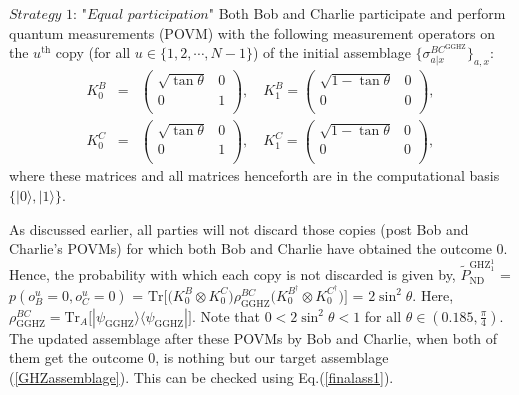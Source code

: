 \documentclass[reprint,superscriptaddress,nofootinbib,amsmath,amssymb,aps,pra,longbibliography]{revtex4-1}
\begin{document}
$\textit{Strategy 1: "Equal participation"}$ Both Bob and Charlie participate and perform quantum measurements (POVM) with the following measurement operators on the $u^{\text{th}}$ copy (for all $u \in \{1, 2, \cdots, N-1\}$) of the initial assemblage $\{\sigma_{a|x}^{BC^{\text{GGHZ}}}\}_{a,x}$:
\begin{eqnarray}
	K_{0}^{B} &=& \left(
\begin{array}{cc}
\sqrt{ \tan \theta } & 0 \\
 0 & 1 \\
\end{array}
\right), \quad K_{1}^{B} =  \left(
\begin{array}{cc}
 \sqrt{1-\tan \theta } & 0 \\
 0 & 0 \\
\end{array}
\right), \nonumber \\
K_{0}^{C} &=& \left(
\begin{array}{cc}
\sqrt{ \tan \theta } & 0 \\
 0 & 1 \\
\end{array}
\right), \quad K_{1}^{C} =  \left(
\begin{array}{cc}
 \sqrt{1-\tan \theta } & 0 \\
 0 & 0 \\
\end{array}
\right),
\label{GHZsteer1}
\end{eqnarray}
 where these matrices and all matrices henceforth are  in the computational basis $\{|0\rangle, |1\rangle\}$.

 As discussed earlier, all parties will not discard those copies (post Bob and Charlie's POVMs) for which both Bob and Charlie have obtained the outcome $0$. Hence, the probability with which each copy is not discarded is given by, $\tilde{P}_{\text{ND}}^{\text{GHZ}_1^1}$ = $p(o^u_B=0, o^u_C=0)$ = $\text{Tr} \Big[ \Big(K_{0}^{B} \otimes K_{0}^{C} \Big) \rho_{\text{GGHZ}}^{BC} \Big(K_{0}^{B^{\dagger}} \otimes K_{0}^{C^{\dagger}} \Big) \Big]$ = $2 \sin^2 \theta$. Here, $\rho_{\text{GGHZ}}^{BC} = \text{Tr}_{A}\Big[ |\psi_{\text{GGHZ}} \rangle \langle \psi_{\text{GGHZ}}|\Big]$. Note that $0 < 2 \sin^2 \theta < 1$ for all $\theta \in ( 0.185, \frac{\pi}{4})$. The updated assemblage after these POVMs by Bob and Charlie, when both of them get the outcome $0$, is nothing but our target assemblage (\ref{GHZassemblage}). This can be checked using Eq.(\ref{finalass1}).
 
\end{document}
